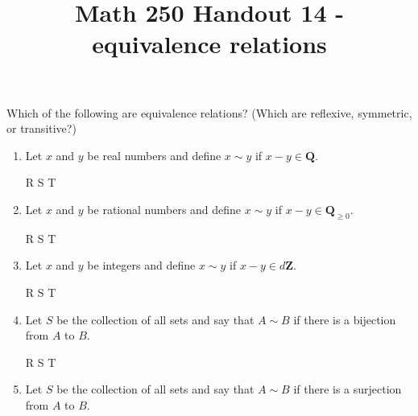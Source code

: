 \documentclass[12pt, reqno]{amsart}
\begin{document}
\title[Math 250 Handout 14  - equivalence relations]{Math 250 Handout
  14  - equivalence relations}\maketitle


Which of the following are equivalence relations? (Which are
  reflexive, symmetric, or transitive?)
\begin{enumerate}



\item  Let $x$ and $y$ be real numbers and define $x \sim y$ if $x -
  y \in \mathbf{Q}$.


\vspace{.4cm}
  \hspace{.4cm} R \hspace{.4cm} S \hspace{.4cm} T
\vspace{.9cm}

\item Let $x$ and $y$ be rational numbers and define $x \sim y$ if $x -
  y \in \mathbf{Q}_{\geq 0}$.


\vspace{.4cm}
  \hspace{.4cm} R \hspace{.4cm} S \hspace{.4cm} T
\vspace{.9cm}

\item   Let $x$ and $y$ be integers and define $x \sim y$ if $x -
  y \in d\mathbf{Z}$. 

\vspace{.4cm}
  \hspace{.4cm} R \hspace{.4cm} S \hspace{.4cm} T
\vspace{.9cm}
  
  \item Let $S$ be the collection of all sets and say that $A \sim
  B$ if there is a bijection from $A$ to $B$.

\vspace{.4cm}
  \hspace{.4cm} R \hspace{.4cm} S \hspace{.4cm} T
\vspace{.9cm}

\item Let $S$ be the collection of all sets and say that $A \sim
  B$ if there is a surjection from $A$ to $B$.


\end{enumerate}
\end{document}
